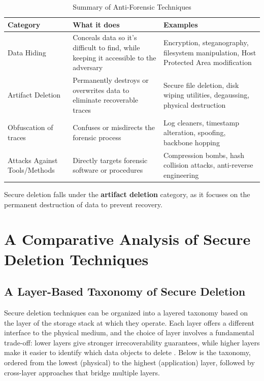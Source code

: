\begin{table}[htbp]
    \centering
    \caption{Summary of Anti-Forensic Techniques}
    \label{tab:antiforensic}
    \begin{tabularx}{\textwidth}{lXX}
        \toprule
        \textbf{Category} & \textbf{What it does} & \textbf{Examples} \\
        \midrule
        Data Hiding & Conceals data so it's difficult to find, while keeping it accessible to the adversary & Encryption, steganography, filesystem manipulation, Host Protected Area modification \\
        \midrule
        Artifact Deletion & Permanently destroys or overwrites data to eliminate recoverable traces & Secure file deletion, disk wiping utilities, degaussing, physical destruction \\
        \midrule
        Obfuscation of traces & Confuses or misdirects the forensic process & Log cleaners, timestamp alteration, spoofing, backbone hopping \\
        \midrule
        Attacks Against Tools/Methods & Directly targets forensic software or procedures & Compression bombs, hash collision attacks, anti-reverse engineering \\
        \bottomrule
    \end{tabularx}
\end{table}

Secure deletion falls under the \textbf{artifact deletion} category, as it focuses on the permanent 
destruction of data to prevent recovery. 

\section {A Comparative Analysis of Secure Deletion Techniques}
\subsection{A Layer-Based Taxonomy of Secure Deletion}
Secure deletion techniques can be organized into a layered taxonomy based on the layer of the storage 
stack at which they operate. Each layer offers a different interface to the physical medium, and the 
choice of layer involves a fundamental trade-off: lower layers give stronger irrecoverability 
guarantees, while higher layers make it easier to identify which data objects to delete \cite{reardon2013sok}.
Below is the taxonomy, ordered from the lowest (physical) to the highest (application) layer, 
followed by cross-layer approaches that bridge multiple layers.

